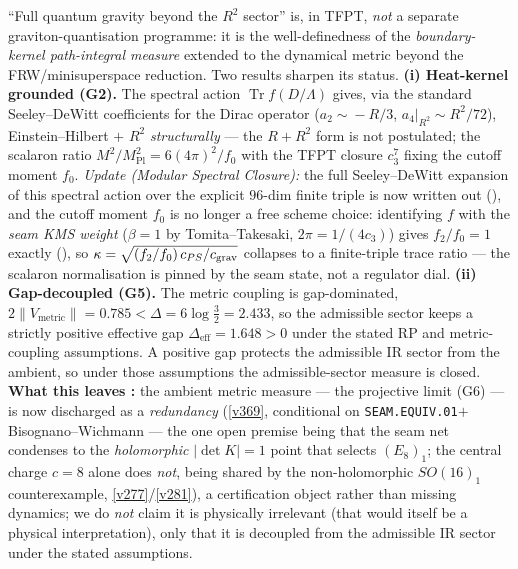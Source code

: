 \documentclass[11pt,a4paper]{article}
\newcommand{\cthree}{c_3}
\newcommand{\Mpl}{M_{\mathrm{Pl}}}
\begin{document}
\begin{keybox}
``Full quantum gravity beyond the $R^2$ sector'' is, in TFPT, \emph{not} a separate graviton-quantisation
programme: it is the well-definedness of the \emph{boundary-kernel path-integral measure} extended to the
dynamical metric beyond the FRW/minisuperspace reduction. Two results sharpen its status.
\textbf{(i) Heat-kernel grounded (G2).} The spectral action $\operatorname{Tr}f(D/\Lambda)$ gives, via the
standard Seeley--DeWitt coefficients for the Dirac operator ($a_2\!\sim\!-R/3$, $a_4|_{R^2}\!\sim\!R^2/72$),
Einstein--Hilbert $+$ $R^2$ \emph{structurally} --- the $R+R^2$ form is not postulated; the scalaron ratio
$M^2/\Mpl^2=6(4\pi)^2/f_0$ with the TFPT closure $\cthree^7$ fixing the cutoff moment $f_0$.
\emph{Update (Modular Spectral Closure):} the full Seeley--DeWitt expansion of this spectral action over the
explicit $96$-dim finite triple is now written out (), and the
cutoff moment $f_0$ is no longer a free scheme choice: identifying $f$ with the \emph{seam KMS weight}
($\beta{=}1$ by Tomita--Takesaki, $2\pi{=}1/(4\cthree)$) gives $f_2/f_0=1$ exactly
(), so $\kappa=\sqrt{(f_2/f_0)\,c_{PS}/c_{\rm grav}}$ collapses to a
finite-triple trace ratio --- the scalaron normalisation is pinned by the seam state, not a regulator dial.
\textbf{(ii) Gap-decoupled (G5).} The metric coupling is gap-dominated,
$2\|V_{\mathrm{metric}}\|=0.785<\Delta=6\log\tfrac32=2.433$, so the admissible sector keeps a strictly
positive effective gap $\Delta_{\mathrm{eff}}=1.648>0$ under the stated RP and metric-coupling assumptions.
A positive gap protects the admissible IR sector from the ambient, so under those assumptions the
admissible-sector measure is closed. \textbf{What this leaves \mC:} the ambient metric measure --- the
projective limit (G6) --- is now discharged as a \emph{redundancy} (\vref{v369}, conditional on
\texttt{SEAM.EQUIV.01}${+}$Bisognano--Wichmann --- the one open premise being that the seam net condenses to
the \emph{holomorphic} $|\det K|{=}1$ point that selects $(E_8)_1$; the central charge $c{=}8$ alone does
\emph{not}, being shared by the non-holomorphic $SO(16)_1$ counterexample, \vref{v277}/\vref{v281}), a
certification object rather than missing dynamics; we do
\emph{not} claim it is physically irrelevant (that would itself be a physical interpretation), only that it is
decoupled from the admissible IR sector under the stated assumptions. 

\end{keybox}
\end{document}

